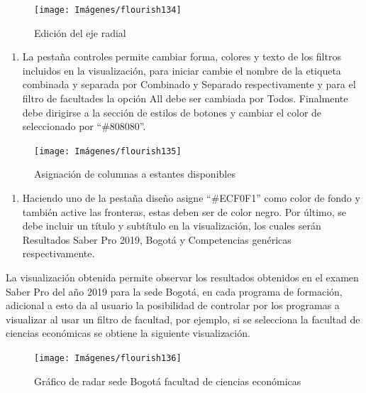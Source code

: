 \documentclass[
]{book}
\providecommand{\tightlist}{%
  \setlength{\itemsep}{0pt}\setlength{\parskip}{0pt}}
\begin{document}
\begin{figure}

{\centering \texttt{[image: Imágenes/flourish134]} 

}

\caption{Edición del eje radial}\label{fig:paso1radarflourish-fig}
\end{figure}

\begin{enumerate}
\def\labelenumi{\arabic{enumi}.}
\setcounter{enumi}{1}
\tightlist
\item
  La pestaña controles permite cambiar forma, colores y texto de los filtros incluidos en la visualización, para iniciar cambie el nombre de la etiqueta combinada y separada por Combinado y Separado respectivamente y para el filtro de facultades la opción All debe ser cambiada por Todos. Finalmente debe dirigirse a la sección de estilos de botones y cambiar el color de seleccionado por ``\#808080''.
\end{enumerate}

\begin{figure}

{\centering \texttt{[image: Imágenes/flourish135]} 

}

\caption{Asignación de columnas a estantes disponibles}\label{fig:paso2radarflourish-fig}
\end{figure}

\begin{enumerate}
\def\labelenumi{\arabic{enumi}.}
\setcounter{enumi}{2}
\tightlist
\item
  Haciendo uno de la pestaña diseño asigne ``\#ECF0F1'' como color de fondo y también active las fronteras, estas deben ser de color negro. Por último, se debe incluir un título y subtítulo en la visualización, los cuales serán Resultados Saber Pro 2019, Bogotá y Competencias genéricas respectivamente.
\end{enumerate}

La visualización obtenida permite observar los resultados obtenidos en el examen Saber Pro del año 2019 para la sede Bogotá, en cada programa de formación, adicional a esto da al usuario la posibilidad de controlar por los programas a visualizar al usar un filtro de facultad, por ejemplo, si se selecciona la facultad de ciencias económicas se obtiene la siguiente visualización.

\begin{figure}

{\centering \texttt{[image: Imágenes/flourish136]} 

}

\caption{Gráfico de radar sede Bogotá facultad de ciencias económicas}\label{fig:radarbogotaflourish-fig}
\end{figure}
\end{document}
